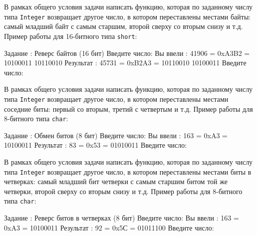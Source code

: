 
\begin{zztask}
В рамках общего условия задачи написать функцию, которая по заданному числу
типа \texttt{Integer} возвращает другое число, в котором переставлены
местами байты: самый младший байт с самым старшим, второй сверху со вторым
снизу и т.д.
Пример работы для 16-битного типа \texttt{short}:
\begin{zzoutput}
  Задание \thezztask: Реверс байтов (16 бит)
  Введите число: 
  Вы ввели  : 41906 = 0xA3B2 = 10100011 10110010
  Результат : 45731 = 0xB2A3 = 10110010 10100011
  Введите число: \zzuser{ }
\end{zzoutput}
\end{zztask}


\begin{zztask}
В рамках общего условия задачи написать функцию, которая по заданному числу
типа \texttt{Integer} возвращает другое число, в котором переставлены
местами соседние биты: первый со вторым, третий с четвертым и т.д.
Пример работы для 8-битного типа \texttt{char}:
\begin{zzoutput}
  Задание \thezztask: Обмен битов (8 бит)
  Введите число: 
  Вы ввели  :  163 = 0xA3 = 10100011
  Результат :   83 = 0x53 = 01010011
  Введите число: \zzuser{ }
\end{zzoutput}
\end{zztask}


\begin{zztask}
В рамках общего условия задачи написать функцию, которая по заданному числу
типа \texttt{Integer} возвращает другое число, в котором переставлены
местами биты в четверках: самый младший бит четверки с самым старшим битом
той же четверки, второй сверху со вторым снизу и т.д.
Пример работы для 8-битного типа \texttt{char}:
\begin{zzoutput}
  Задание \thezztask: Реверс битов в четверках (8 бит)
  Введите число: 
  Вы ввели  :  163 = 0xA3 = 10100011
  Результат :   92 = 0x5С = 01011100
  Введите число: \zzuser{ }
\end{zzoutput}
\end{zztask}

